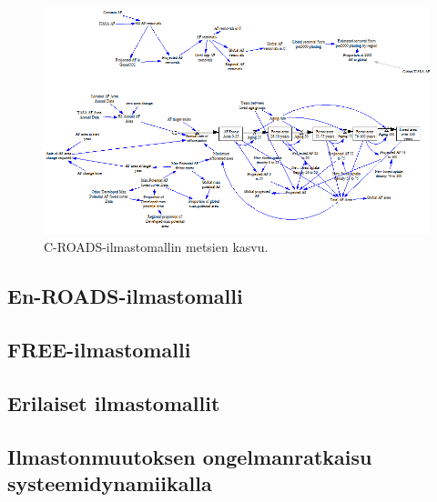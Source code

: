 \documentclass[finnish,12pt,a4paper,pdftex]{article}
\begin{document}
\begin{onehalfspacing}
\begin{figure}[H] %
\centering \includegraphics[width=\textwidth]{c-roads-af}
\caption{C-ROADS-ilmastomallin metsien kasvu. \cite{Croads} \label{ilmasto:af}}
\end{figure}

\subsection{En-ROADS-ilmastomalli \label{ilmasto:enroads}}

\subsection{FREE-ilmastomalli \label{ilmasto:free}}

\subsection{Erilaiset ilmastomallit \label{ilmasto:muut}}

\subsection{Ilmastonmuutoksen ongelmanratkaisu systeemidynamiikalla \label{ilmasto:ongelmanratkaisu}}


\clearpage




\end{onehalfspacing}
\end{document}
